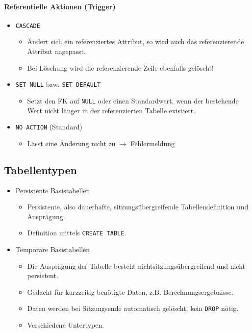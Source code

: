 \documentclass[a4paper, 11pt, accentcolor = tud3b]{tudreport}
\begin{document}
                	\paragraph{Referentielle Aktionen (Trigger)}
						\begin{itemize}
							\item \lstinline|CASCADE|
								\begin{itemize}
									\item Ändert sich ein referenziertes Attribut, so wird auch das referenzierende Attribut angepasst.
									\item Bei Löschung wird die referenzierende Zeile ebenfalls gelöscht!
								\end{itemize}
							\item \lstinline|SET NULL| bzw. \lstinline|SET DEFAULT|
								\begin{itemize}
									\item Setzt den FK auf \lstinline|NULL| oder einen Standardwert, wenn der bestehende Wert nicht länger in der referenzierten Tabelle existiert.
								\end{itemize}
							\item \lstinline|NO ACTION| (Standard)
								\begin{itemize}
									\item Lässt eine Änderung nicht zu \(\rightarrow\) Fehlermeldung
								\end{itemize}
						\end{itemize}

            \subsection{Tabellentypen} %
                \begin{itemize}
                	\item Persistente Basistabellen
                		\begin{itemize}
                			\item Persistente, also dauerhafte, sitzungsübergreifende Tabellendefinition und Ausprägung.
                			\item Definition mittels \lstinline|CREATE TABLE|.
                		\end{itemize}
                	\item Temporäre Basistabellen
                		\begin{itemize}
                			\item Die Ausprägung der Tabelle besteht nichtsitzungsübergreifend und nicht persistent.
                			\item Gedacht für kurzzeitig benötigte Daten, z.B. Berechnungsergebnisse.
                			\item Daten werden bei Sitzungsende automatisch gelöscht, kein \lstinline|DROP| nötig.
                			\item Verschiedene Untertypen.
                		\end{itemize}
                \end{itemize}
\end{document}
